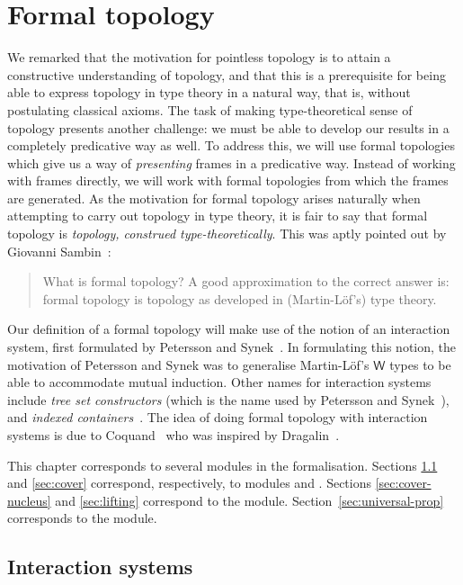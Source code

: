 \chapter{Formal topology}\label{chap:formal-topo}

We remarked that the motivation for pointless topology is to attain a constructive
understanding of topology, and that this is a prerequisite for being able to express
topology in type theory in a natural way, that is, without postulating classical axioms.
The task of making type-theoretical sense of topology presents another challenge: we must
be able to develop our results in a completely predicative way as well. To address this,
we will use formal topologies which give us a way of \emph{presenting} frames in a
predicative way. Instead of working with frames directly, we will work with formal
topologies from which the frames are generated. As the motivation for formal topology
arises naturally when attempting to carry out topology in type theory, it is fair to say
that formal topology is \emph{topology, construed type-theoretically}. This was aptly
pointed out by Giovanni Sambin~\cite{sambin-domains}:
\begin{quote}
  What is formal topology? A good approximation to the correct answer is: formal topology
  is topology as developed in (Martin-Löf's) type theory.
\end{quote}

Our definition of a formal topology will make use of the notion of an interaction system,
first formulated by Petersson and Synek~\cite{tree-sets}. In formulating this notion, the
motivation of Petersson and Synek was to generalise Martin-Löf's $\mathsf{W}$ types to be
able to accommodate mutual induction. Other names for interaction systems include
\emph{tree set constructors} (which is the name used by Petersson and
Synek~\cite{tree-sets}), and \emph{indexed containers}~\cite{indexed-containers}. The idea
of doing formal topology with interaction systems is due to Coquand~\cite{coq-posets} who
was inspired by Dragalin~\cite{dragalin}.

This chapter corresponds to several modules in the \veragda{} formalisation. Sections
\ref{sec:intr-sys} and \ref{sec:cover} correspond, respectively, to modules
 and . Sections \ref{sec:cover-nucleus} and
\ref{sec:lifting} correspond to the  module.
Section~\ref{sec:universal-prop} corresponds to the  module.

\section{Interaction systems}\label{sec:intr-sys}


